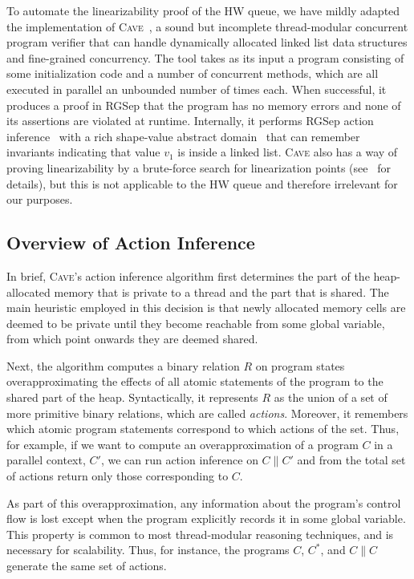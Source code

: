 \documentclass{LMCS}
\begin{document}
To automate the linearizability proof of the HW queue, we have mildly adapted
the implementation of \textsc{Cave}~\cite{Vaf2010}, a sound but incomplete
thread-modular concurrent program verifier that can handle dynamically
allocated linked list data structures and fine-grained concurrency.
The tool takes as its input a program consisting of some initialization code
and a number of concurrent methods, which are all executed in parallel an unbounded
number of times each. When successful, it produces a proof in RGSep that the
program has no memory errors and none of its assertions are violated at runtime.
Internally, it performs RGSep action inference~\cite{Vaf2010a} with a rich
shape-value abstract domain~\cite{Vaf2009} that can remember invariants 
indicating that value $v_1$ is inside a linked list.
\textsc{Cave} also has a way of proving linearizability by a brute-force search
for linearization points (see~\cite{Vaf2010} for details), but this is not
applicable to the HW queue and therefore irrelevant for our purposes.

\subsection*{Overview of Action Inference}

In brief, \textsc{Cave}'s action inference algorithm first determines the part of
the heap-allocated memory that is private to a thread and the part that is shared. 
The main heuristic employed in this decision is that newly allocated memory 
cells are deemed to be private until they become reachable from some global 
variable, from which point onwards they are deemed shared.

Next, the algorithm computes a binary relation $R$ on program states 
overapproximating the effects of all atomic statements of the program 
to the shared part of the heap. 
Syntactically, it represents $R$ as the union of a set of more primitive 
binary relations, which are called \emph{actions}.
Moreover, it remembers which atomic program statements correspond 
to which actions of the set.
Thus, for example, if we want to compute an overapproximation of a 
program $C$ in a parallel context, $C'$, we can run action inference
on $C\|C'$ and from the total set of actions return only those corresponding
to $C$. 

As part of this overapproximation, any information about the program's 
control flow is lost except when the program explicitly records it in some 
global variable.  This property is common to most thread-modular 
reasoning techniques, and is necessary for scalability.
Thus, for instance, the programs $C$, $C^*$, and $C\|C$ generate 
the same set of actions.
\end{document}
